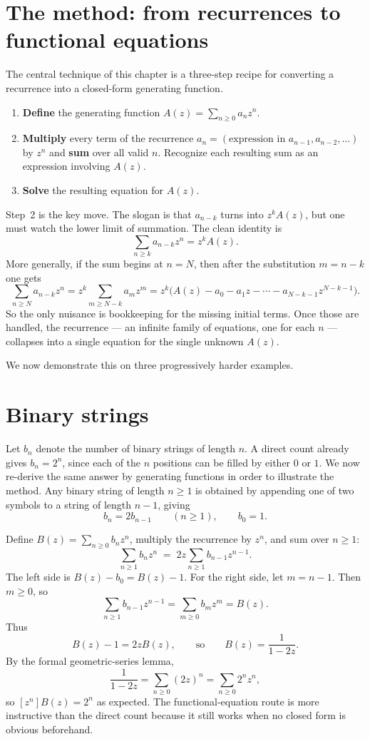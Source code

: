 \section*{The method: from recurrences to functional equations}

The central technique of this chapter is a three-step recipe for converting a recurrence into a closed-form generating function.

\begin{enumerate}
\item \textbf{Define} the generating function $A(z) = \sum_{n \ge 0} a_n z^n$.
\item \textbf{Multiply} every term of the recurrence $a_n = (\text{expression in } a_{n-1}, a_{n-2}, \ldots)$ by $z^n$ and \textbf{sum} over all valid $n$. Recognize each resulting sum as an expression involving $A(z)$.
\item \textbf{Solve} the resulting equation for $A(z)$.
\end{enumerate}

Step~2 is the key move. The slogan is that $a_{n-k}$ turns into $z^kA(z)$, but one must watch the lower limit of summation. The clean identity is
\[
  \sum_{n \ge k} a_{n-k} z^n = z^k A(z).
\]
More generally, if the sum begins at $n=N$, then after the substitution $m=n-k$ one gets
\[
  \sum_{n \ge N} a_{n-k} z^n
  = z^k \sum_{m \ge N-k} a_m z^m
  = z^k\bigl(A(z) - a_0 - a_1 z - \cdots - a_{N-k-1}z^{N-k-1}\bigr).
\]
So the only nuisance is bookkeeping for the missing initial terms. Once those are handled, the recurrence --- an infinite family of equations, one for each $n$ --- collapses into a single equation for the single unknown $A(z)$.

We now demonstrate this on three progressively harder examples.

\section*{Binary strings}

Let $b_n$ denote the number of binary strings of length $n$. A direct count already gives $b_n = 2^n$, since each of the $n$ positions can be filled by either $0$ or $1$. We now re-derive the same answer by generating functions in order to illustrate the method. Any binary string of length $n \ge 1$ is obtained by appending one of two symbols to a string of length $n-1$, giving
\[
  b_n = 2b_{n-1} \qquad (n \ge 1), \qquad b_0 = 1.
\]

Define $B(z) = \sum_{n \ge 0} b_n z^n$, multiply the recurrence by $z^n$, and sum over $n \ge 1$:
\[
  \sum_{n \ge 1} b_n z^n \;=\; 2z \sum_{n \ge 1} b_{n-1} z^{n-1}.
\]
The left side is $B(z)-b_0 = B(z)-1$. For the right side, let $m=n-1$. Then $m \ge 0$, so
\[
  \sum_{n \ge 1} b_{n-1} z^{n-1}
  = \sum_{m \ge 0} b_m z^m
  = B(z).
\]
Thus
\[
  B(z) - 1 = 2zB(z), \qquad \text{so} \qquad B(z) = \frac{1}{1-2z}.
\]
By the formal geometric-series lemma,
\[
  \frac{1}{1-2z} = \sum_{n \ge 0} (2z)^n = \sum_{n \ge 0} 2^n z^n,
\]
so $[z^n]B(z)=2^n$ as expected. The functional-equation route is more instructive than the direct count because it still works when no closed form is obvious beforehand.

